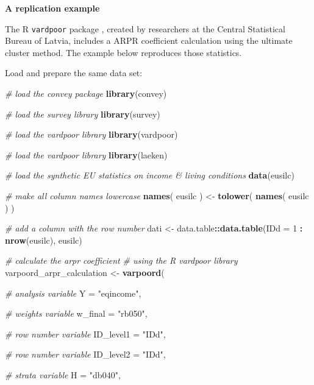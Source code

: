 \documentclass[]{book}
\newenvironment{Shaded}{\begin{snugshade}}{\end{snugshade}}
\newcommand{\CommentTok}[1]{\textcolor[rgb]{0.56,0.35,0.01}{\textit{#1}}}
\newcommand{\DataTypeTok}[1]{\textcolor[rgb]{0.13,0.29,0.53}{#1}}
\newcommand{\DecValTok}[1]{\textcolor[rgb]{0.00,0.00,0.81}{#1}}
\newcommand{\KeywordTok}[1]{\textcolor[rgb]{0.13,0.29,0.53}{\textbf{#1}}}
\newcommand{\NormalTok}[1]{#1}
\newcommand{\OperatorTok}[1]{\textcolor[rgb]{0.81,0.36,0.00}{\textbf{#1}}}
\newcommand{\StringTok}[1]{\textcolor[rgb]{0.31,0.60,0.02}{#1}}
\begin{document}
\textbf{A replication example}

The R \texttt{vardpoor} package \citep{vardpoor}, created by researchers at the Central Statistical Bureau of Latvia, includes a ARPR coefficient calculation using the ultimate cluster method. The example below reproduces those statistics.

Load and prepare the same data set:

\begin{Shaded}
\begin{Highlighting}[]
\CommentTok{# load the convey package}
\KeywordTok{library}\NormalTok{(convey)}

\CommentTok{# load the survey library}
\KeywordTok{library}\NormalTok{(survey)}

\CommentTok{# load the vardpoor library}
\KeywordTok{library}\NormalTok{(vardpoor)}

\CommentTok{# load the vardpoor library}
\KeywordTok{library}\NormalTok{(laeken)}

\CommentTok{# load the synthetic EU statistics on income & living conditions}
\KeywordTok{data}\NormalTok{(eusilc)}

\CommentTok{# make all column names lowercase}
\KeywordTok{names}\NormalTok{( eusilc ) <-}\StringTok{ }\KeywordTok{tolower}\NormalTok{( }\KeywordTok{names}\NormalTok{( eusilc ) )}

\CommentTok{# add a column with the row number}
\NormalTok{dati <-}\StringTok{ }\NormalTok{data.table}\OperatorTok{::}\KeywordTok{data.table}\NormalTok{(}\DataTypeTok{IDd =} \DecValTok{1} \OperatorTok{:}\StringTok{ }\KeywordTok{nrow}\NormalTok{(eusilc), eusilc)}

\CommentTok{# calculate the arpr coefficient}
\CommentTok{# using the R vardpoor library}
\NormalTok{varpoord_arpr_calculation <-}
\StringTok{    }\KeywordTok{varpoord}\NormalTok{(}
    
        \CommentTok{# analysis variable}
        \DataTypeTok{Y =} \StringTok{"eqincome"}\NormalTok{, }
        
        \CommentTok{# weights variable}
        \DataTypeTok{w_final =} \StringTok{"rb050"}\NormalTok{,}
        
        \CommentTok{# row number variable}
        \DataTypeTok{ID_level1 =} \StringTok{"IDd"}\NormalTok{,}
        
        \CommentTok{# row number variable}
        \DataTypeTok{ID_level2 =} \StringTok{"IDd"}\NormalTok{,}
        
        \CommentTok{# strata variable}
        \DataTypeTok{H =} \StringTok{"db040"}\NormalTok{, }
        

\end{Highlighting}
\end{Shaded}
\end{document}
